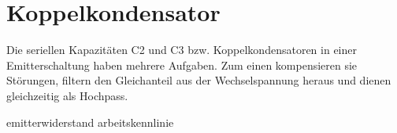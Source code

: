 \section{Koppelkondensator}
Die seriellen Kapazitäten C2 und C3 bzw. Koppelkondensatoren in einer Emitterschaltung haben mehrere Aufgaben. Zum einen kompensieren sie Störungen, filtern den Gleichanteil aus der Wechselspannung 
heraus und dienen gleichzeitig als Hochpass.
\clearpage

emitterwiderstand
arbeitskennlinie